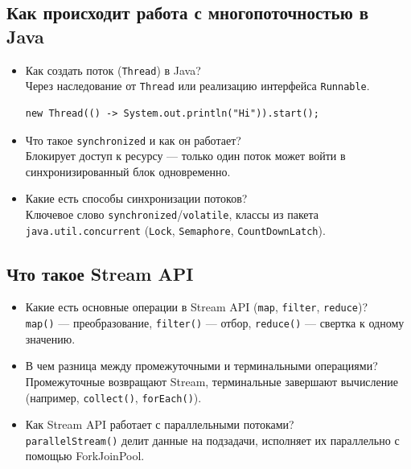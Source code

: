 \documentclass[a4paper,14pt]{article}
\begin{document}
\subsection{Как происходит работа с многопоточностью в Java}

\begin{itemize}
\item Как создать поток (\texttt{Thread}) в Java? \\
Через наследование от \texttt{Thread} или реализацию интерфейса \texttt{Runnable}.
\begin{lstlisting}[style=javastyle]
new Thread(() -> System.out.println("Hi")).start();
\end{lstlisting}


\item Что такое \texttt{synchronized} и как он работает? \\
Блокирует доступ к ресурсу — только один поток может войти в синхронизированный блок одновременно.

\item Какие есть способы синхронизации потоков? \\
Ключевое слово \texttt{synchronized}/\texttt{volatile}, классы из пакета \texttt{java.util.concurrent} (\texttt{Lock}, \texttt{Semaphore}, \texttt{CountDownLatch}).


\end{itemize}

\subsection{Что такое Stream API}

\begin{itemize}
\item Какие есть основные операции в Stream API (\texttt{map}, \texttt{filter}, \texttt{reduce})? \\
\texttt{map()} — преобразование, \texttt{filter()} — отбор, \texttt{reduce()} — свертка к одному значению.


\item В чем разница между промежуточными и терминальными операциями? \\
Промежуточные возвращают Stream, терминальные завершают вычисление (например, \texttt{collect()}, \texttt{forEach()}).

\item Как Stream API работает с параллельными потоками? \\
\texttt{parallelStream()} делит данные на подзадачи, исполняет их параллельно с помощью ForkJoinPool.


\end{itemize}
\end{document}
